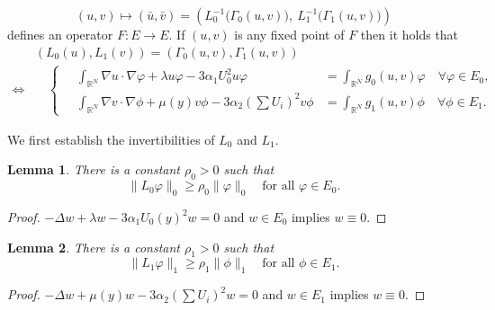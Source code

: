 \documentclass[a4paper,11pt]{article}
\def\blue{\color{blue}}
\def\blue{\color{blue}}
\newtheorem{lemma}{Lemma}[section]
\theoremstyle{remark}
\begin{document}
$$(u,v) \mapsto (\bar{u},\bar{v})=\left(L_0^{-1}\Big(\Gamma_0(u,v)\Big), ~L_1^{-1}\Big(\Gamma_1(u,v)\Big)\right)$$
defines an operator $F: E \rightarrow E$. If $(u,v)$ is any fixed point of $F$ then it holds that
\begin{align*}
 &\left(L_0(u),L_1(v)\right) = \left(\Gamma_0(u,v),\Gamma_1(u,v)\right)\\
 \Longleftrightarrow &
 \quad\left\{ \quad
 \begin{aligned}
  \int_{\mathbb{R}^N} \nabla u \cdot \nabla \varphi + \lambda u\varphi - 3\alpha_1U_0^2 u\varphi &= \int_{\mathbb{R}^N} g_0(u,v)\varphi \quad \forall \varphi\in E_0,\\
  \int_{\mathbb{R}^N} \nabla v \cdot \nabla \phi + \mu(y) v\phi - 3\alpha_2\left(\sum U_i\right)^2v\phi &= \int_{\mathbb{R}^N} g_1(u,v)\phi \quad \forall \phi \in E_1.
 \end{aligned}
 \right.
\end{align*}

We first establish the invertibilities of $L_0$ and $L_1$.
\begin{lemma} \label{inv0} There is a constant $\rho_0>0$ such that
$$ \|L_0 \varphi\|_0 \ge \rho_0 \|\varphi\|_0 \quad \text{for all $\varphi \in E_0$}.$$
\end{lemma}
\begin{proof}
\blue
 $-\Delta w + \lambda w - 3\alpha_1U_0(y)^2 w = 0$ and $w \in E_0$ implies $w\equiv0$. 
\end{proof}
\begin{lemma} \label{inv1} There is a constant $\rho_1>0$ such that
$$ \|L_1 \varphi\|_1 \ge \rho_1 \|\phi\|_1 \quad \text{for all $\phi \in E_1$}.$$
\end{lemma}
\begin{proof}
\blue
 $-\Delta w + \mu(y) w - 3\alpha_2\left(\sum U_i\right)^2 w = 0$ and $w \in E_1$ implies $w\equiv0$. 
\end{proof}
\end{document}
